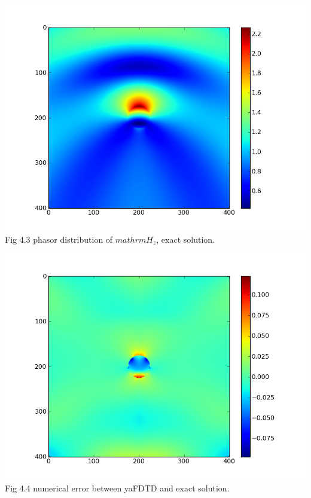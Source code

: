 \documentclass[openany]{book}
\begin{document}
\begin{center}
\includegraphics[scale=0.8]{images/phasor-exam-exact.png}\\
Fig 4.3
phasor distribution of $mathrm{H_z}$, exact solution.
\end{center}
\begin{center}
\includegraphics[scale=0.8]{images/errors.png}\\
Fig 4.4
numerical error between yaFDTD and exact solution.
\end{center}
\end{document}

